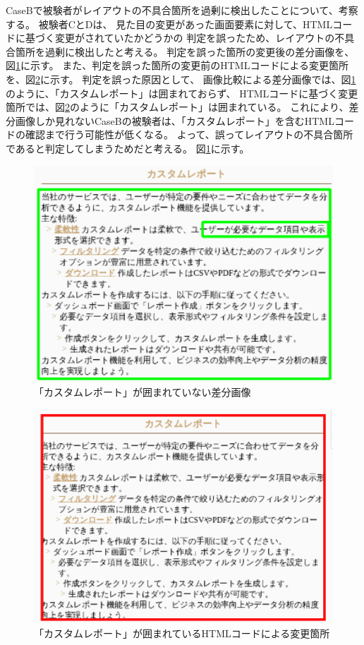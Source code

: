 CaseBで被験者がレイアウトの不具合箇所を過剰に検出したことについて、考察する。
被験者CとDは、
見た目の変更があった画面要素に対して、HTMLコードに基づく変更がされていたかどうかの
判定を誤ったため、レイアウトの不具合箇所を過剰に検出したと考える。
判定を誤った箇所の変更後の差分画像を、図\ref{fig:app1}に示す。
また、判定を誤った箇所の変更前のHTMLコードによる変更箇所を、図\ref{fig:app2}に示す。
判定を誤った原因として、
画像比較による差分画像では、図\ref{fig:app1}のように、「カスタムレポート」は囲まれておらず、
HTMLコードに基づく変更箇所では、図\ref{fig:app2}のように「カスタムレポート」は囲まれている。
これにより、差分画像しか見れないCaseBの被験者は、「カスタムレポート」を含むHTMLコードの確認まで行う可能性が低くなる。
よって、誤ってレイアウトの不具合箇所であると判定してしまうためだと考える。
図\ref{fig:app1}に示す。
\begin{figure}[ht]
    \centering
    \includegraphics[width=1.0\textwidth]{image/6/app1.png}
    \caption{「カスタムレポート」が囲まれていない差分画像}
    \label{fig:app1}
\end{figure}

\begin{figure}[ht]
    \centering
    \includegraphics[width=1.0\textwidth]{image/6/app2.png}
    \caption{「カスタムレポート」が囲まれているHTMLコードによる変更箇所}
    \label{fig:app2}
\end{figure}

